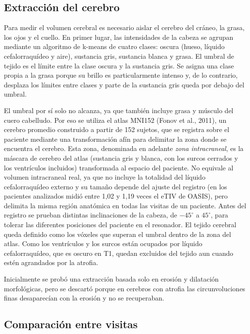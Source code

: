 \documentclass[10pt]{article}
\begin{document}
\subsection{Extracción del cerebro}
 
Para medir el volumen cerebral es necesario aislar el cerebro del cráneo, la grasa, los ojos y el cuello. En primer lugar, las intensidades de la cabeza se agrupan mediante un algoritmo de k-means de cuatro clases: oscura (hueso, líquido cefalorraquídeo y aire), sustancia gris, sustancia blanca y grasa. El umbral de tejido es el límite entre la clase oscura y la sustancia gris. Se asigna una clase propia a la grasa porque su brillo es particularmente intenso y, de lo contrario, desplaza los límites entre clases y parte de la sustancia gris queda por debajo del umbral.
 
El umbral por sí solo no alcanza, ya que también incluye grasa y músculo del cuero cabelludo. Por eso se utiliza el atlas MNI152 (Fonov et al., 2011), un cerebro promedio construido a partir de 152 sujetos, que se registra sobre el paciente mediante una transformación afín para delimitar la zona donde se encuentra el cerebro. Esta zona, denominada en adelante \textit{zona intracraneal}, es la máscara de cerebro del atlas (sustancia gris y blanca, con los surcos cerrados y los ventrículos incluidos) transformada al espacio del paciente. No equivale al volumen intracraneal real, ya que no incluye la totalidad del líquido cefalorraquídeo externo y su tamaño depende del ajuste del registro (en los pacientes analizados midió entre 1,02 y 1,19 veces el eTIV de OASIS), pero delimita la misma región anatómica en todas las visitas de un paciente. Antes del registro se prueban distintas inclinaciones de la cabeza, de $-45^\circ$ a $45^\circ$, para tolerar las diferentes posiciones del paciente en el resonador. El tejido cerebral queda definido como los vóxeles que superan el umbral dentro de la zona del atlas. Como los ventrículos y los surcos están ocupados por líquido cefalorraquídeo, que es oscuro en T1, quedan excluidos del tejido aun cuando estén agrandados por la atrofia.
 
Inicialmente se probó una extracción basada solo en erosión y dilatación morfológicas, pero se descartó porque en cerebros con atrofia las circunvoluciones finas desaparecían con la erosión y no se recuperaban.
 
\subsection{Comparación entre visitas}
 
\end{document}
